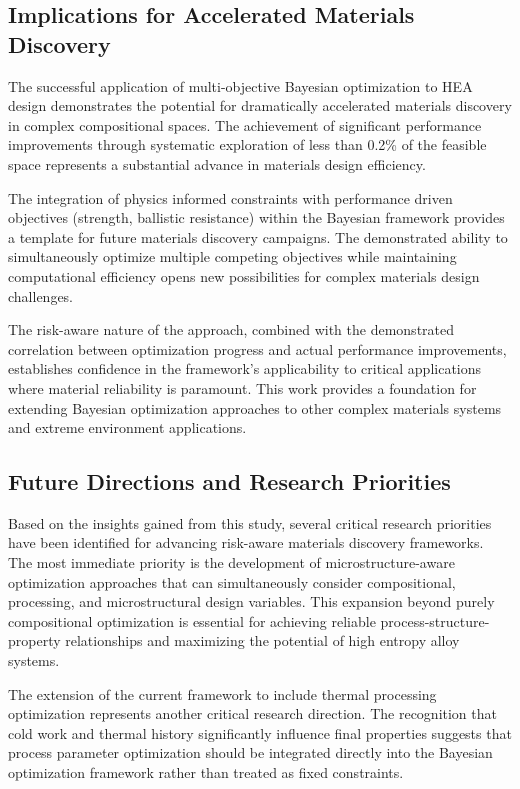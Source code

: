 \subsection{Implications for Accelerated Materials Discovery}

The successful application of multi-objective Bayesian optimization to HEA design demonstrates the potential for dramatically accelerated materials discovery in complex compositional spaces. The achievement of significant performance improvements through systematic exploration of less than 0.2\% of the feasible space represents a substantial advance in materials design efficiency.

The integration of physics informed constraints with performance driven objectives (strength, ballistic resistance) within the Bayesian framework provides a template for future materials discovery campaigns. The demonstrated ability to simultaneously optimize multiple competing objectives while maintaining computational efficiency opens new possibilities for complex materials design challenges.

The risk-aware nature of the approach, combined with the demonstrated correlation between optimization progress and actual performance improvements, establishes confidence in the framework's applicability to critical applications where material reliability is paramount. This work provides a foundation for extending Bayesian optimization approaches to other complex materials systems and extreme environment applications.


\subsection{Future Directions and Research Priorities}

Based on the insights gained from this study, several critical research priorities have been identified for advancing risk-aware materials discovery frameworks. The most immediate priority is the development of microstructure-aware optimization approaches that can simultaneously consider compositional, processing, and microstructural design variables. This expansion beyond purely compositional optimization is essential for achieving reliable process-structure-property relationships and maximizing the potential of high entropy alloy systems.


The extension of the current framework to include thermal processing optimization represents another critical research direction. The recognition that cold work and thermal history significantly influence final properties suggests that process parameter optimization should be integrated directly into the Bayesian optimization framework rather than treated as fixed constraints.

